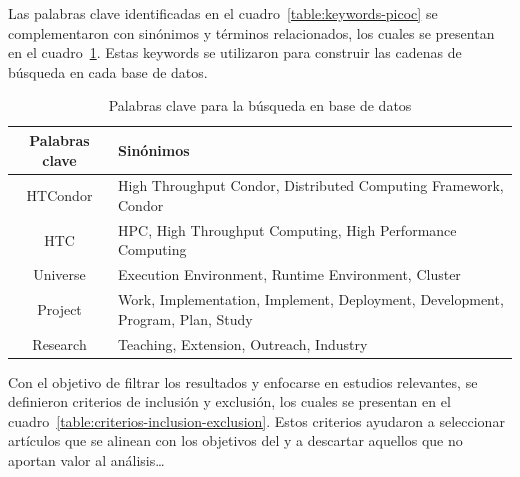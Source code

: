 Las palabras clave identificadas en el cuadro~\ref{table:keywords-picoc} se complementaron con sinónimos y términos relacionados, los cuales se presentan en el cuadro~\ref{tab:keywords}. Estas keywords se utilizaron para construir las cadenas de búsqueda en cada base de datos.


\begin{table}[H]
	\centering
	\scriptsize
	\setlength{\tabcolsep}{4pt}
	\fontsize{9pt}{10pt}\selectfont %
	\begin{tabular}{|c|p{12.5cm}|} %
		\hline
		\textbf{Palabras clave} & \textbf{Sinónimos}                                                             \\
		\hline
		HTCondor                & High Throughput Condor, Distributed Computing Framework, Condor                \\
		\hline
		HTC                     & HPC, High Throughput Computing, High Performance Computing                     \\
		\hline
		Universe                & Execution Environment, Runtime Environment, Cluster                            \\
		\hline
		Project                 & Work, Implementation, Implement, Deployment, Development, Program, Plan, Study \\
		\hline
		Research                & Teaching, Extension, Outreach, Industry                                        \\
		\hline
	\end{tabular}
	\caption{Palabras clave para la búsqueda en base de datos}
	\label{tab:keywords}
\end{table}



\noindent
Con el objetivo de filtrar los resultados y enfocarse en estudios relevantes, se definieron criterios de inclusión y exclusión, los cuales se presentan en el cuadro~\ref{table:criterios-inclusion-exclusion}. Estos criterios ayudaron a seleccionar artículos que se alinean con los objetivos del \SMS y a descartar aquellos que no aportan valor al análisis\dots

